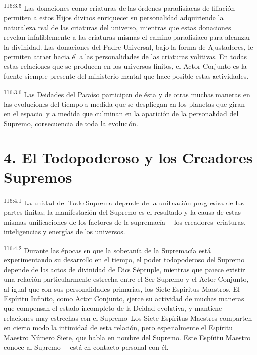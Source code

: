 \par
\textsuperscript{116:3.5} Las donaciones como criaturas de las órdenes paradisiacas de filiación permiten a estos Hijos divinos enriquecer su personalidad adquiriendo la naturaleza real de las criaturas del universo, mientras que estas donaciones revelan infaliblemente a las criaturas mismas el camino paradisiaco para alcanzar la divinidad. Las donaciones del Padre Universal, bajo la forma de Ajustadores, le permiten atraer hacia él a las personalidades de las criaturas volitivas. En todas estas relaciones que se producen en los universos finitos, el Actor Conjunto es la fuente siempre presente del ministerio mental que hace posible estas actividades.

\par
\textsuperscript{116:3.6} Las Deidades del Paraíso participan de ésta y de otras muchas maneras en las evoluciones del tiempo a medida que se despliegan en los planetas que giran en el espacio, y a medida que culminan en la aparición de la personalidad del Supremo, consecuencia de toda la evolución.

\section*{4. El Todopoderoso y los Creadores Supremos}
\par
\textsuperscript{116:4.1} La unidad del Todo Supremo depende de la unificación progresiva de las partes finitas; la manifestación del Supremo es el resultado y la causa de estas mismas unificaciones de los factores de la supremacía ---los creadores, criaturas, inteligencias y energías de los universos.

\par
\textsuperscript{116:4.2} Durante las épocas en que la soberanía de la Supremacía está experimentando su desarrollo en el tiempo, el poder todopoderoso del Supremo depende de los actos de divinidad de Dios Séptuple, mientras que parece existir una relación particularmente estrecha entre el Ser Supremo y el Actor Conjunto, al igual que con sus personalidades primarias, los Siete Espíritus Maestros. El Espíritu Infinito, como Actor Conjunto, ejerce su actividad de muchas maneras que compensan el estado incompleto de la Deidad evolutiva, y mantiene relaciones muy estrechas con el Supremo. Los Siete Espíritus Maestros comparten en cierto modo la intimidad de esta relación, pero especialmente el Espíritu Maestro Número Siete, que habla en nombre del Supremo. Este Espíritu Maestro conoce al Supremo ---está en contacto personal con él.

